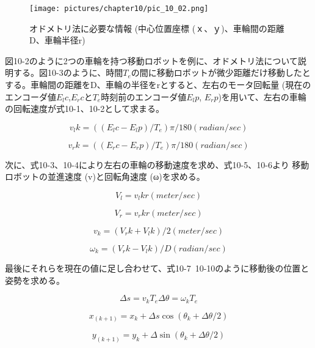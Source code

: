 \begin{figure}[htp]
  \centering
  \texttt{[image: pictures/chapter10/pic\_10\_02.png]}
  \caption{オドメトリ法に必要な情報 (中心位置座標 (ｘ、ｙ)、車輪間の距離D、車輪半径r)}
\end{figure}

図10-2のように2つの車輪を持つ移動ロボットを例に、オドメトリ法について説明する。図10-3のように、時間$T_e$の間に移動ロボットが微少距離だけ移動したとする。車輪間の距離をD、車輪の半径をrとすると、左右のモータ回転量 (現在のエンコーダ値$E_lc$,$E_rc$と$T_e$時刻前のエンコーダ値$E_lp$, $E_rp$)を用いて、左右の車輪の回転速度が式10-1、10-2として求まる。

\begin{equation}
v_lk = ((E_lc-E_lp)/T_e) π/180     (radian/sec)
\end{equation}

\begin{equation}
v_rk = ((E_rc-E_rp)/T_e)π/180     (radian/sec)
\end{equation}

次に、式10-3、10-4により左右の車輪の移動速度を求め、式10-5、10-6より   移動ロボットの並進速度 (v)と回転角速度 (ω)を求める。

\begin{equation}
V_l = v_lk r     (meter/sec)
\end{equation}

\begin{equation}
V_r = v_rk r     (meter/sec)
\end{equation}

\begin{equation}
v_k = (V_rk+V_lk)/2     (meter/sec)
\end{equation}

\begin{equation}
\omega_k=(V_rk-V_lk)/D     (radian/sec)
\end{equation}

最後にそれらを現在の値に足し合わせて、式10-7~10-10のように移動後の位置と姿勢を求める。

\begin{equation}
\Delta s=v_k T_e
\Delta\theta=\omega_k T_e
\end{equation}

\begin{equation}
x_(k+1)=x_k+\Delta s \cos(\theta_k+\Delta\theta/2)
\end{equation}

\begin{equation}
y_(k+1)=y_k+\Delta \sin(\theta_k+\Delta\theta/2)
\end{equation}

